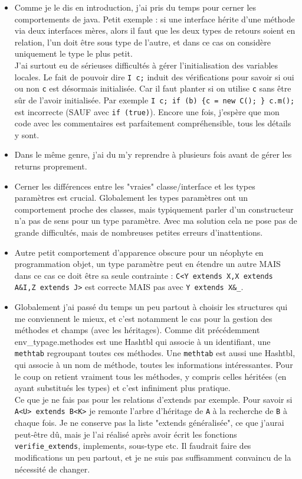 \documentclass[12pt,a4paper]{report}
\begin{document}
\begin{itemize}
\item Comme je le dis en introduction, j'ai pris du temps pour cerner les comportements de java. Petit exemple : si une interface hérite d'une méthode via deux interfaces mères, alors il faut que les deux types de retours soient en relation, l'un doit être sous type de l'autre, et dans ce cas on considère uniquement le type le plus petit. \\
J'ai surtout eu de sérieuses difficultés à gérer l'initialisation des variables locales. Le fait de pouvoir dire \texttt{I c;} induit des vérifications pour savoir si oui ou non \texttt{c} est désormais initialisée. Car il faut planter si on utilise \texttt{c} sans être sûr de l'avoir initialisée. Par exemple \texttt{I c; if (b) \{c = new C(); \} c.m();} est incorrecte (SAUF avec \texttt{if (true)}). Encore une fois, j'espère que mon code avec les commentaires est parfaitement compréhensible, tous les détails y sont.
\item Dans le même genre, j'ai du m'y reprendre à plusieurs fois avant de gérer les returns proprement.
\item Cerner les différences entre les "vraies" classe/interface et les types paramètres est crucial. Globalement les types paramètres ont un comportement proche des classes, mais typiquement parler d'un constructeur n'a pas de sens pour un type paramètre. Avec ma solution cela ne pose pas de grande difficultés, mais de nombreuses petites erreurs d'inattentions.
\item Autre petit comportement d'apparence obscure pour un néophyte en programmation objet, un type paramètre peut en étendre un autre MAIS dans ce cas ce doit être sa seule contrainte : \texttt{C<Y extends X,X extends A\&I,Z extends J>} est correcte MAIS pas avec \texttt{Y extends X\&\_}.
\item Globalement j'ai passé du temps un peu partout à choisir les structures qui me conviennent le mieux, et c'est notamment le cas pour la gestion des méthodes et champs (avec les héritages). Comme dit précédemment env\_typage.methodes est une Hashtbl qui associe à un identifiant, une \texttt{methtab} regroupant toutes ces méthodes. Une \texttt{methtab} est aussi une Hashtbl, qui associe à un nom de méthode, toutes les informations intéressantes. Pour le coup on retient vraiment tous les méthodes, y compris celles héritées (en ayant substitués les types) et c'est infiniment plus pratique. \\ Ce que je ne fais pas pour les relations d'extends par exemple. Pour savoir si \texttt{A<U> extends B<K>} je remonte l'arbre d'héritage de \texttt{A} à la recherche de \texttt{B} à chaque fois. Je ne conserve pas la liste "extends généralisée", ce que j'aurai peut-être dû, mais je l'ai réalisé après avoir écrit les fonctions \texttt{verifie\_extends}, implements, sous-type etc. Il faudrait faire des modifications un peu partout, et je ne suis pas suffisamment convaincu de la nécessité de changer. 

\end{itemize}
\end{document}
